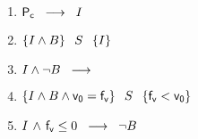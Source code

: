 \documentclass[10pt,a4paper]{article}
\begin{document}
    \begin{enumerate}
        \item $\mathsf{P_{c}} \hspace{2mm} \longrightarrow \hspace{2mm} I$
        \item $\left\lbrace I \land B \right\rbrace \hspace{2mm} S \hspace{2mm} \left\lbrace I \right\rbrace$
        \item $I \land \neg B  \hspace{2mm} \longrightarrow \hspace{2mm} $ \postcondicion
        \item $\left\lbrace I \land B \land \mathsf{v_{0}} = \mathsf{f_{v}} \right\rbrace \hspace{2mm} S \hspace{2mm} \left\lbrace \mathsf{f_{v}} < \mathsf{v_{0}} \right\rbrace$
        \item $I \hspace{0.5mm} \land \hspace{0.5mm} \mathsf{f_{v}} \leq 0  \hspace{2mm} \longrightarrow \hspace{2mm} \neg B$
    \end{enumerate} 
    
\end{document}
